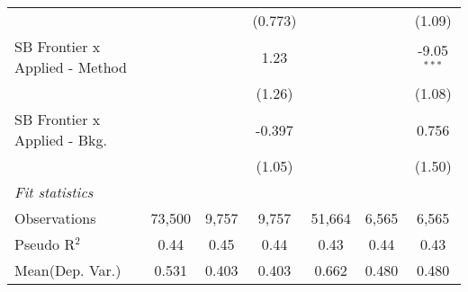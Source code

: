 \begin{tabular}{lcccccc}
                                  &               &               & (0.773)       &               &               & (1.09)\\   
   SB Frontier x Applied - Method &               &               & 1.23          &               &               & -9.05$^{***}$\\   
                                  &               &               & (1.26)        &               &               & (1.08)\\   
   SB Frontier x Applied - Bkg.   &               &               & -0.397        &               &               & 0.756\\   
                                  &               &               & (1.05)        &               &               & (1.50)\\   
   \midrule
   \emph{Fit statistics}\\
   Observations                   & 73,500        & 9,757         & 9,757         & 51,664        & 6,565         & 6,565\\  
   Pseudo R$^2$                   & 0.44          & 0.45          & 0.44          & 0.43          & 0.44          & 0.43\\  
Mean(Dep. Var.) & 0.531 & 0.403 & 0.403 & 0.662 & 0.480 & 0.480 \\
   

\end{tabular}
